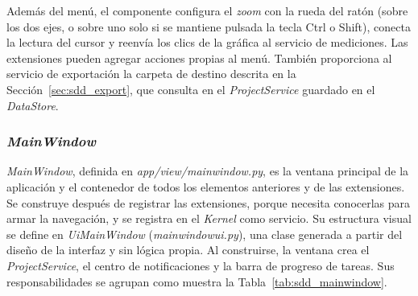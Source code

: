 \documentclass[12pt,letterpaper,oneside]{article}
\DeclareRobustCommand{\_}{\textunderscore\allowbreak}
\begin{document}
Además del menú, el componente configura el \textit{zoom} con la rueda del ratón (sobre los dos ejes, o sobre uno solo si se mantiene pulsada la tecla Ctrl o Shift), conecta la lectura del cursor y reenvía los clics de la gráfica al servicio de mediciones. Las extensiones pueden agregar acciones propias al menú. También proporciona al servicio de exportación la carpeta de destino descrita en la Sección~\ref{sec:sdd_export}, que consulta en el \textit{ProjectService} guardado en el \textit{DataStore}.

\subsubsection{\textit{MainWindow}}
\label{sec:sdd_mainwindow}

\textit{MainWindow}, definida en \textit{app/view/main\_window.py}, es la ventana principal de la aplicación y el contenedor de todos los elementos anteriores y de las extensiones. Se construye después de registrar las extensiones, porque necesita conocerlas para armar la navegación, y se registra en el \textit{Kernel} como servicio. Su estructura visual se define en \textit{Ui\_MainWindow} (\textit{main\_window\_ui.py}), una clase generada a partir del diseño de la interfaz y sin lógica propia. Al construirse, la ventana crea el \textit{ProjectService}, el centro de notificaciones y la barra de progreso de tareas. Sus responsabilidades se agrupan como muestra la Tabla~\ref{tab:sdd_mainwindow}.
\end{document}
